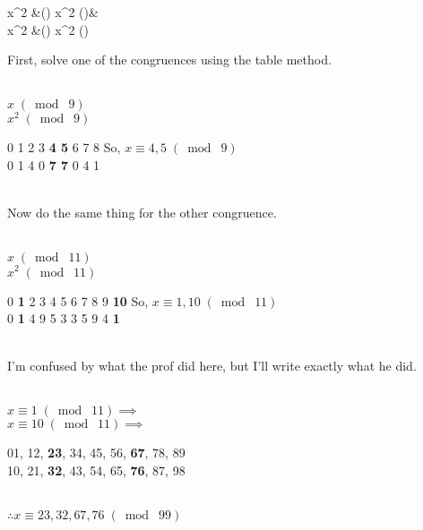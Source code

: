 \documentclass{letter}
\begin{document}
\begin{enumerate}[i)]
		\begin{flalign*}
			x^2 &\;(\bmod{}) \implies x^2 \;(\bmod\; 9)&\\
			x^2 &\;(\bmod{}) \implies x^2 \;(\bmod\; 11)
		\end{flalign*}
		First, solve one of the congruences using the table method.\\\\
		\begin{minipage}[t]{0.2\textwidth}
			$x\;(\bmod{})$\\
			$x^2\;(\bmod\; 9)$
		\end{minipage}
		\begin{minipage}[t]{0.5\textwidth}
			0 1 2 3 \textbf{4 5} 6 7 8 \;\;\;\;\; So, $x \equiv 4, 5\;(\bmod\; 9)$\\
			0 1 4 0 \textbf{7 7} 0 4 1\\
		\end{minipage}\\
		Now do the same thing for the other congruence.\\\\
		\begin{minipage}[t]{0.2\textwidth}
			$x\;(\bmod{})$\\
			$x^2\;(\bmod\; 11)$
		\end{minipage}
		\begin{minipage}[t]{0.5\textwidth}
			0 \textbf{1} 2 3 4 5 6 7 8 9 \textbf{10} \;\;\;\;\; So, $x \equiv 1, 10\;(\bmod\; 11)$\\
			0 \textbf{1} 4 9 5 3 3 5 9 4 \textbf{1}\\
		\end{minipage}\\
		I'm confused by what the prof did here, but I'll write exactly what he did.\\\\
		\begin{minipage}[t]{0.2\textwidth}
			$x \equiv 1\;(\bmod\; 11) \implies$\\
			$x \equiv 10\;(\bmod\; 11)\implies$
		\end{minipage}
		\begin{minipage}[t]{0.5\textwidth}
			01, 12, \textbf{23}, 34, 45, 56, \textbf{67}, 78, 89\\
			10, 21, \textbf{32}, 43, 54, 65, \textbf{76}, 87, 98\\
		\end{minipage}\\
		$\therefore x \equiv 23, 32, 67, 76\;(\bmod\; 99)$
	\end{enumerate}
	
\end{document}
